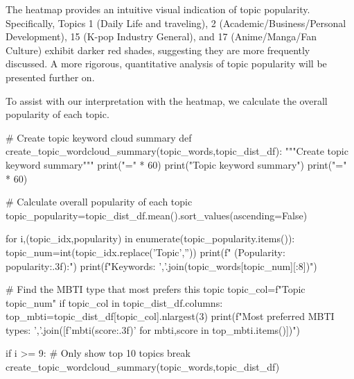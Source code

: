\documentclass[12pt]{article}
\numberwithin{figure}{section}  %
\begin{document}
	The heatmap provides an intuitive visual indication of topic popularity.
	Specifically, Topics 1 (Daily Life and traveling),
	2 (Academic/Business/Personal Development), 15 (K-pop Industry General), and
	17 (Anime/Manga/Fan Culture) exhibit darker red shades, suggesting they are
	more frequently discussed. A more rigorous, quantitative analysis of topic
	popularity will be presented further on.
	
	To assist with our interpretation with the heatmap, we calculate the overall
	popularity of each topic.
	\begin{python}
# Create topic keyword cloud summary
def create_topic_wordcloud_summary(topic_words,topic_dist_df):
    """Create topic keyword summary"""
    print("=" * 60)
    print("Topic keyword summary")
    print("=" * 60)
    
    # Calculate overall popularity of each topic
    topic_popularity=topic_dist_df.mean().sort_values(ascending=False)
    
    for i,(topic_idx,popularity) in enumerate(topic_popularity.items()):
        topic_num=int(topic_idx.replace('Topic',''))
        print(f" (Popularity: {popularity:.3f}):")
        print(f"Keywords: {','.join(topic_words[topic_num][:8])}")
        
        # Find the MBTI type that most prefers this topic
        topic_col=f"Topic {topic_num}"
        if topic_col in topic_dist_df.columns:
            top_mbti=topic_dist_df[topic_col].nlargest(3)
            print(f"Most preferred MBTI types: {','.join([f'{mbti}({score:.3f})' for mbti,score in top_mbti.items()])}")
        
        if i >= 9:  # Only show top 10 topics
            break
create_topic_wordcloud_summary(topic_words,topic_dist_df)
	\end{python}
\end{document}
